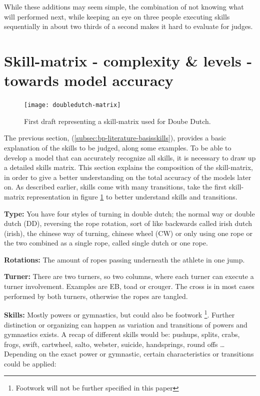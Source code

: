 While these additions may seem simple, the combination of not knowing what will performed next, while keeping an eye on three people executing skills sequentially in about two thirds of a second makes it hard to evaluate for judges.

\section{Skill-matrix - complexity \& levels - towards model accuracy}
\label{lit:skill-matrix}

\begin{figure}
    \centering
    \texttt{[image: doubledutch-matrix]}
    \caption[skill-matrix-DD]{First draft representing a skill-matrix used for Doube Dutch.}
    \label{fig:doubledutch-skill-matrix}
\end{figure}

The previous section, (\ref{subsec:bp-literature-basisskills}), provides a basic explanation of the skills to be judged, along some examples. To be able to develop a model that can accurately recognize all skills, it is necessary to draw up a detailed skills matrix. This section explains the composition of the skill-matrix, in order to give a better understanding on the total accuracy of the models later on. As described earlier, skills come with many transitions, take the first skill-matrix representation in figure \ref{fig:doubledutch-skill-matrix} to better understand skills and transitions.

\textbf{Type:} You have four styles of turning in double dutch; the normal way or double dutch (DD), reversing the rope rotation, sort of like backwards called irish dutch (irish), the chinese way of turning, chinese wheel (CW) or only using one rope or the two combined as a single rope, called single dutch or one rope.

\textbf{Rotations:} The amount of ropes passing underneath the athlete in one jump.

\textbf{Turner:} There are two turners, so two columns, where each turner can execute a turner involvement. Examples are EB, toad or crouger. The cross is in most cases performed by both turners, otherwise the ropes are tangled.

\textbf{Skills:} Mostly powers or gymnastics, but could also be footwork \footnote{Footwork will not be further specified in this paper}. Further distinction or organizing can happen as variation and transitions of powers and gymnastics exists. A recap of different skills would be: pushups, splits, crabs, frogs, swift, cartwheel, salto, webster, suicide, handsprings, round offs \dots %
Depending on the exact power or gymnastic, certain characteristics or transitions could be applied:

